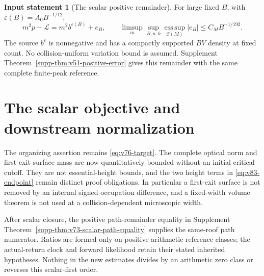 \documentclass[11pt,reqno]{amsart}
\numberwithin{equation}{section}
\theoremstyle{definition}
\newtheorem{inputstatement}[theorem]{Input statement}
\theoremstyle{remark}\newtheorem{remark}[theorem]{Remark}
\newcommand{\esssup}{\operatorname*{ess\,sup}}
\begin{document}
\begin{inputstatement}[The scalar positive remainder]
\label{input:v83-scalar}
For large fixed $B$, with $\varepsilon(B)=A_0B^{-1/12}$,
\begin{equation}\label{eq:v76-remainder}
 m^2p-\mathcal L=m^2b^{\varepsilon(B)}+e_B,\qquad
 \limsup_m\sup_{R,n,k}\esssup_{\mathcal C(M)}|e_B|
                                      \le C_MB^{-1/192}.
\end{equation}
The source $b^\varepsilon$ is nonnegative and has a compactly supported
$BV$ density at fixed count. No collision-uniform variation bound is
assumed. Supplement Theorem~\ref{supp-thm:v51-positive-error} gives
this remainder with the same complete finite-peak reference.
\end{inputstatement}





\section{The scalar objective and downstream normalization}
The organizing assertion remains \eqref{eq:v76-target}. The complete
optical norm and first-exit surface mass are now quantitatively bounded
without an initial critical cutoff. They are not essential-height
bounds, and the two height terms in \eqref{eq:v83-endpoint} remain
distinct proof obligations. In particular a first-exit surface is not
removed by an internal signed occupation difference, and a fixed-width
volume theorem is not used at a collision-dependent microscopic width.

After scalar closure, the positive path-remainder equality in
Supplement Theorem~\ref{supp-thm:v73-scalar-path-equality} supplies
the same-roof path numerator. Ratios are formed only on positive
arithmetic reference classes; the actual-return clock and forward
likelihood retain their stated inherited hypotheses. Nothing in the
new estimates divides by an arithmetic zero class or reverses this
scalar-first order.

\appendix


\end{document}
